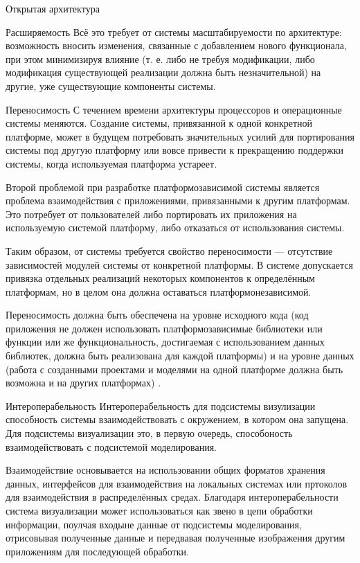 \documentclass[a4paper,12pt]{extarticle}
\begin{document}
\begin{subsection}{Открытая архитектура}
\begin{subsubsection}{Расширяемость}
        Всё это требует от системы масштабируемости по архитектуре: возможность вносить изменения, связанные с добавлением нового функционала, при этом минимизируя влияние (т. е. либо не требуя модификации, либо модификация существующей реализации должна быть незначительной) на другие, уже существующие компоненты системы.
    \end{subsubsection}
        
    \begin{subsubsection}{Переносимость}
        С течением времени архитектуры процессоров и операционные системы меняются. Создание системы, привязанной к одной конкретной платформе, может в будущем потребовать значительных усилий для портирования системы под другую платформу или вовсе привести к прекращению поддержки системы, когда используемая платформа устареет.
        
        Второй проблемой при разработке платформозависимой системы является проблема взаимодействия с приложениями, привязанными к другим платформам. Это потребует от пользователей либо портировать их приложения на используемую системой платформу, либо отказаться от использования системы.
        
        Таким образом, от системы требуется свойство переносимости --- отсутствие  зависимостей модулей системы от конкретной платформы. В системе допускается привязка отдельных реализаций некоторых компонентов к определённым платформам, но в целом она должна оставаться платформонезависимой.
        
        Переносимость должна быть обеспечена на уровне исходного кода (код приложения не должен использовать платформозависимые библиотеки или функции или же функциональность, достигаемая с использованием данных библиотек, должна быть реализована для каждой платформы) и на уровне данных (работа с созданными проектами и моделями на одной платформе должна быть возможна и на других платформах) \cite{ieee}.
    \end{subsubsection}
        
    \begin{subsubsection}{Интероперабельность}
        Интероперабельность для подсистемы визулизации способность системы взаимодействовать с окружением, в котором она запущена. Для подсистемы визуализации это, в первую очередь, способоность взаимодействовать с подсистемой моделирования.
        
        Взаимодействие основывается на использовании общих форматов хранения данных, интерфейсов для взаимодействия на локальных системах или пртоколов для взаимодействия в распределённых средах. Благодаря интероперабельности система визуализации может использоваться как звено в цепи обработки информации, поулчая входыне данные от подсистемы моделирования, отрисовывая полученные данные и передвавая полученные изображения другим приложениям для последующей обработки.
    \end{subsubsection}
        

\end{subsection}
\end{document}
